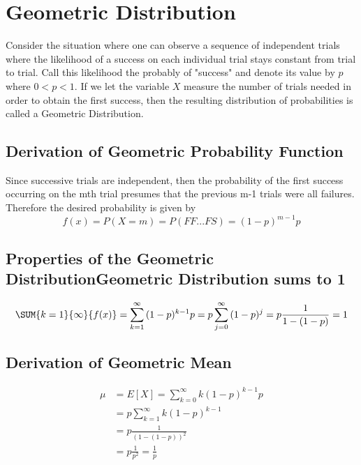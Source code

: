 \documentclass[10pt,]{book}
\theoremstyle{plain}
\theoremstyle{definition}
\theoremstyle{definition}
\numberwithin{equation}{section}
\newcommand{\lt}{ < }
\begin{document}
\section[Geometric Distribution]{Geometric Distribution}\label{GeometricDistribution}
Consider the situation where one can observe a sequence  of independent
	trials where the likelihood of a success on each individual trial
	stays constant from trial to trial. Call this likelihood the probably of
	"success" and denote its value by \(p\) 
	where \( 0 \lt p \lt 1 \).  
	If we let the variable \(X\) measure the number of trials needed in order
	to obtain the first success, 
	then the resulting distribution of probabilities is called a 
	Geometric Distribution.%
\typeout{************************************************}
\typeout{************************************************}
\subsection[Derivation of Geometric Probability Function]{Derivation of Geometric Probability Function}\label{subsection-20}
 Since successive trials are independent, then the probability 
			of the first success occurring on the mth trial presumes that
			the previous m-1 trials were all failures.  Therefore the 
			desired probability is given by %
\begin{equation*}f(x) = P(X=m) = P(FF...FS) = (1-p)^{m-1}p\end{equation*}\typeout{************************************************}
\typeout{************************************************}
\subsection[Properties of the Geometric DistributionGeometric Distribution sums to 1]{Properties of the Geometric DistributionGeometric Distribution sums to 1}\label{subsection-21}
\begin{gather*}
\SUM {k=1} {\infty} {f(x)} = \sum_{k=1}^{\infty} {(1-p)^{k-1} p} = p \sum_{j=0}^{\infty} {(1-p)^j} = p \frac{1}{1-(1-p)} = 1
\end{gather*}\typeout{************************************************}
\typeout{************************************************}
\subsection[Derivation of Geometric Mean]{Derivation of Geometric Mean}\label{subsection-22}
\begin{align*}
\mu & = E[X] = \sum_{k=0}^{\infty} {k(1-p)^{k-1}p}\\
 & = p \sum_{k=1}^{\infty} {k(1-p)^{k-1}}\\
 & = p \frac{1}{(1-(1-p))^2}\\
 & = p \frac{1}{p^2} = \frac{1}{p}
\end{align*}\typeout{************************************************}
\typeout{************************************************}
\end{document}
